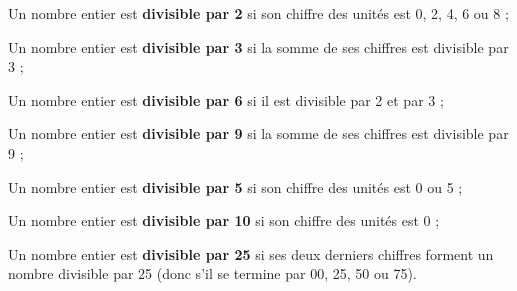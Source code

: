   
\begin{aconnaitre}
Un nombre entier est \textbf{\textcolor{A1}{divisible par 2}} si son chiffre des unités est 0, 2, 4, 6 ou 8 ;

Un nombre entier est \textbf{\textcolor{A1}{divisible par 3}} si la somme de ses chiffres est divisible par 3 ;

Un nombre entier est \textbf{\textcolor{A1}{divisible par 6}} si il est divisible par 2 et par 3 ;

Un nombre entier est \textbf{\textcolor{A1}{divisible par 9}} si la somme de ses chiffres est divisible par 9 ;

Un nombre entier est \textbf{\textcolor{A1}{divisible par 5}} si son chiffre des unités est 0 ou 5 ;

Un nombre entier est \textbf{\textcolor{A1}{divisible par 10}} si son chiffre des unités est 0 ;

Un nombre entier est \textbf{\textcolor{A1}{divisible par 25}} si ses deux derniers chiffres forment un nombre divisible par 25 (donc s'il se termine par 00, 25, 50 ou 75).
\end{aconnaitre}




